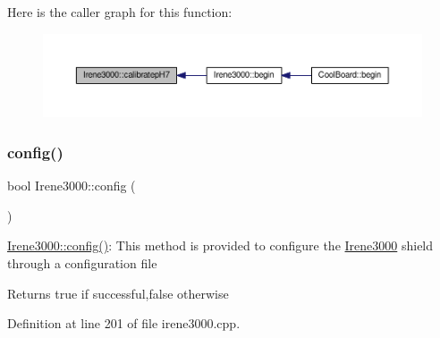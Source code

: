 Here is the caller graph for this function\+:\nopagebreak
\begin{figure}[H]
\begin{center}
\leavevmode
\includegraphics[width=350pt]{d6/d03/class_irene3000_a1d3299202e4cb7afcff9c9e3e95d94c1_icgraph}
\end{center}
\end{figure}
\mbox{\label{class_irene3000_afed5c35e4b23963c157847ef27c11e9c}} 
\subsubsection{\texorpdfstring{config()}{config()}}
{\footnotesize\ttfamily bool Irene3000\+::config (\begin{DoxyParamCaption}{ }\end{DoxyParamCaption})}

\hyperlink{class_irene3000_afed5c35e4b23963c157847ef27c11e9c}{Irene3000\+::config()}\+: This method is provided to configure the \hyperlink{class_irene3000}{Irene3000} shield through a configuration file

\begin{DoxyReturn}{Returns}
true if successful,false otherwise 
\end{DoxyReturn}


Definition at line 201 of file irene3000.\+cpp.


